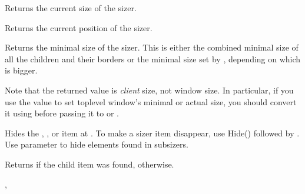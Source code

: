
Returns the current size of the sizer.


\label{wxsizergetposition}


Returns the current position of the sizer.


\label{wxsizergetminsize}


Returns the minimal size of the sizer. This is either the combined minimal
size of all the children and their borders or the minimal size set by 
, depending on which is bigger.

Note that the returned value is \emph{client} size, not window size.  In
particular, if you use the value to set toplevel window's minimal or actual
size, you should convert it using
 before
passing it to  or
.


\label{wxsizerhide}




Hides the , , or item at .
To make a sizer item disappear, use Hide() followed by .
Use parameter  to hide elements found in subsizers.

Returns \true if the child item was found, \false otherwise.


,\rtfsp
{}


\label{wxsizerinsert}



